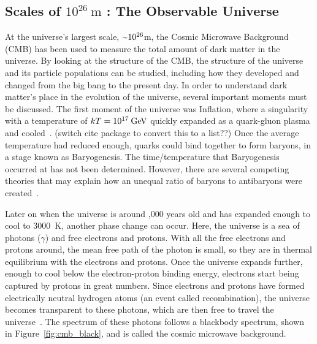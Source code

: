 \subsection{Scales of $10^{26}\:\text{m}$ : The Observable Universe}\label{dm_universe}
At the universe's largest scale, $\nicetilde 10^{26}$m, the Cosmic Microwave Background (CMB) has been used to measure the total amount of dark matter in the universe.
By looking at the structure of the CMB, the structure of the universe and its particle populations can be studied, including how they developed and changed from the big bang to the present day.
In order to understand dark matter's place in the evolution of the universe, several important moments must be discussed.
The first moment of the universe was Inflation, where a singularity with a temperature of $kT=10^{17}\:\textrm{\GeV{}}$ quickly expanded as a quark-gluon plasma and cooled~\cite{inflation0,inflation1,inflation2,inflation3}.
{\color{red}(switch cite package to convert this to a list??)}
Once the average temperature had reduced enough, quarks could bind together to form baryons, in a stage known as Baryogenesis.
The time/temperature that Baryogenesis occurred at has not been determined.
However, there are several competing theories that may explain how an unequal ratio of baryons to antibaryons were created~\cite{baryogenesis1,baryogenesis2}.

Later on when the universe is around ,000 years old and has expanded enough to cool to \nicetilde\SI{3000}{K}, another phase change can occur.
Here, the universe is a sea of photons ($\gamma$) and free electrons and protons.
With all the free electrons and protons around, the mean free path of the photon is small, so they are in thermal equilibrium with the electrons and protons.
Once the universe expands further, enough to cool below the electron-proton binding energy, electrons start being captured by protons in great numbers.
Since electrons and protons have formed electrically neutral hydrogen atoms (an event called recombination), the universe becomes transparent to these photons, which are then free to travel the universe~\cite{planck2015,theEarlyUniverse,CMBFundamentals,CMBFlat}.
The spectrum of these photons follows a blackbody spectrum, shown in Figure~\ref{fig:cmb_black}, and is called the cosmic microwave background.

